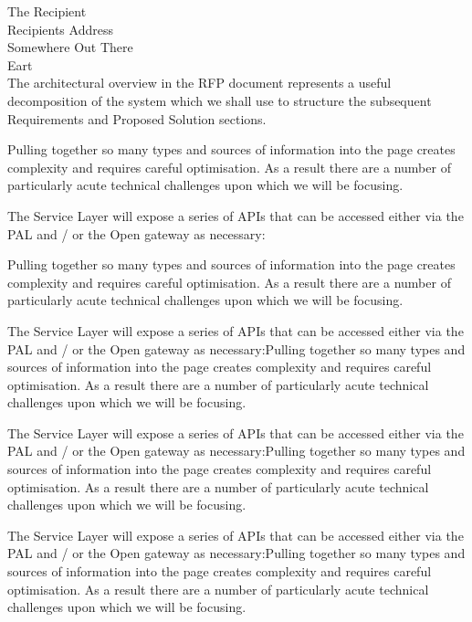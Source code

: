 \documentclass[10pt, a4paper, parskip=half,
               enlargefirstpage ]{scrlttr2}
\begin{document}
\newcommand{\tystrsubtitle}{}
\newcommand{\tystrtitle}{Untitled Document}
\newcommand{\tystrauthor}{LShift}
\newcommand{\tystrclient}{LShift}
\newcommand{\tystrproject}{internal}
\newcommand{\tystraffiliation}{LShift blah blah}
\newcommand{\tystrversion}{0.0}
\newcommand{\tystrdate}{2012-07-12}



\newcommand{\tystrrecipientaddress}{Recipients Address\\  Somewhere Out There\\  Eart \\}
\newcommand{\tystrrecipient}{The Recipient}

\tystrrecipient \\
\tystrrecipientaddress
The architectural overview in the RFP document represents a useful decomposition of the system which we shall use to structure the subsequent Requirements and Proposed Solution sections.

Pulling together so many types and sources of information into the page creates complexity and requires careful optimisation. As a result there are a number of particularly acute technical challenges upon which we will be focusing.

The Service Layer will expose a series of APIs that can be accessed either via the PAL and / or the Open gateway as necessary:

Pulling together so many types and sources of information into the page creates complexity and requires careful optimisation. As a result there are a number of particularly acute technical challenges upon which we will be focusing.

The Service Layer will expose a series of APIs that can be accessed either via the PAL and / or the Open gateway as necessary:Pulling together so many types and sources of information into the page creates complexity and requires careful optimisation. As a result there are a number of particularly acute technical challenges upon which we will be focusing.

The Service Layer will expose a series of APIs that can be accessed either via the PAL and / or the Open gateway as necessary:Pulling together so many types and sources of information into the page creates complexity and requires careful optimisation. As a result there are a number of particularly acute technical challenges upon which we will be focusing.

The Service Layer will expose a series of APIs that can be accessed either via the PAL and / or the Open gateway as necessary:Pulling together so many types and sources of information into the page creates complexity and requires careful optimisation. As a result there are a number of particularly acute technical challenges upon which we will be focusing.
\end{document}
